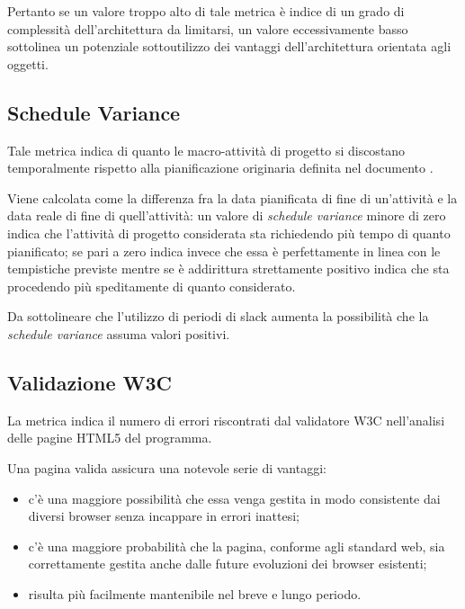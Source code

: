 Pertanto se un valore troppo alto di tale metrica è indice di un grado di complessità dell'architettura da limitarsi, un valore eccessivamente basso sottolinea un potenziale sottoutilizzo dei vantaggi dell'architettura orientata agli oggetti.


\subsection{Schedule Variance}
Tale metrica indica di quanto le macro-attività di progetto si discostano temporalmente rispetto alla pianificazione originaria definita nel documento \PdP . 

Viene calcolata come la differenza fra la data pianificata di fine di un'attività e la data reale di fine di quell'attività: un valore di \emph{schedule variance} minore di zero indica che l'attività di progetto considerata sta richiedendo più tempo di quanto pianificato; se pari a zero indica invece che essa è perfettamente in linea con le tempistiche previste mentre se è addirittura strettamente positivo indica che sta procedendo più speditamente di quanto considerato. 

Da sottolineare che l'utilizzo di periodi di slack aumenta la possibilità che la \emph{schedule variance} assuma valori positivi.


\subsection{Validazione W3C}
La metrica indica il numero di errori riscontrati dal validatore W3C nell'analisi delle pagine HTML5 del programma.

Una pagina valida assicura una notevole serie di vantaggi:
\begin{itemize}
 	\item c'è una maggiore possibilità che essa venga gestita in modo consistente dai diversi browser senza incappare in errori inattesi;
 	\item c'è una maggiore probabilità che la pagina, conforme agli standard web, sia correttamente gestita anche dalle future evoluzioni dei browser esistenti;
 	\item risulta più facilmente mantenibile nel breve e lungo periodo.
\end{itemize}


